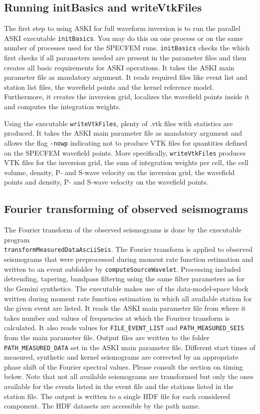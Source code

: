 \subsection{Running initBasics and writeVtkFiles}
%
 The first step to using ASKI for full waveform inversion is to run the parallel ASKI executable \verb+initBasics+. You may do this on one process or on the same number of processes used for the SPECFEM runs. \verb+initBasics+ checks the which first checks if all parameters needed are present in the parameter files and then creates all basic requirements for ASKI operations. It takes the ASKI main parameter file as mandatory argument. It reads required files like event list and station list files, the wavefield points and the kernel reference model. Furthermore, it creates the inversion grid, localizes the wavefield points inside it and computes the integration weights.

 Using the executable \verb+writeVtkFiles+, plenty of .vtk files with statistics are produced. It takes the ASKI main parameter file as mandatory argument and allows the flag \verb+-nowp+ indicating not to produce VTK files for quantities defined on the SPECFEM wavefield points. More specifically, \verb+writeVtkFiles+ produces VTK files for the inversion grid, the sum of integration weights per cell, the cell volume, density, P- and S-wave velocity on the inversion grid, the wavefield points and density, P- and S-wave velocity on the wavefield points.
%
\subsection{Fourier transforming of observed seismograms}
%
The Fourier transform of the observed seismograms is done by the executable program \\ \verb+transformMeasuredDataAsciiSeis+. The Fourier transform is applied to observed seismograms that were preprocessed during moment rate function estimation and written to an event subfolder by \verb+computeSourceWavelet+. Processing included detrending, tapering, bandpass filtering using the same filter parameters as for the Gemini synthetics. The executable makes use of the data-model-space block written during moment rate function estimation in which all available station for the given event are listed. It reads the ASKI main parameter file from where it takes number and values of frequencies at which the Fourirer transform is calculated. It also reads values for \verb+FILE_EVENT_LIST+ and \verb+PATH_MEASURED_SEIS+ from the main parameter file. Output files are written to the folder \verb+PATH_MEASURED_DATA+ set in the ASKI main parameter file. Different start times of measured, synthetic and kernel seismograms are corrected by an appropriate phase shift of the Fourier spectral values. Please consult the section on timing below. Note that not all available seismograms are transformed but only the ones available for the events listed in the event file and the stations listed in the station file. The output is written to a single HDF file for each considered component. The HDF datasets are accessible by the path name.

